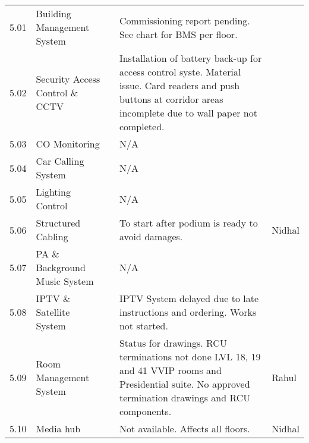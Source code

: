 \begin{fullwidth}
\begin{longtable}{@{}lp{3.5cm}@{}lp{5cm}p{1.5cm}}
5.01	&Building Management System	&& Commissioning report pending. See chart for BMS per floor.& \\	


5.02	&Security Access Control \& CCTV	&&Installation of battery back-up for access control syste. Material issue. Card readers and push buttons at corridor areas incomplete due to wall paper not completed.&\\	

5.03	&CO Monitoring		&&N/A&\\

5.04	&Car Calling System		&&N/A&\\

5.05	&Lighting Control		&&N/A&\\

5.06	&Structured Cabling		&&To start after podium is ready to avoid damages.& Nidhal\\

5.07	&PA \& Background Music System &&N/A&\\
	
5.08	&IPTV \& Satellite System	&&IPTV System delayed due to late instructions and ordering. Works not started.&\\	

5.09	&Room Management System	&&Status for drawings. RCU terminations not done LVL 18, 19 and 41 VVIP rooms and Presidential suite. No approved termination drawings and RCU components.&Rahul\\

5.10 &Media hub && Not available. Affects all floors.&Nidhal \\

\bottomrule
\end{longtable}
\end{fullwidth}




















